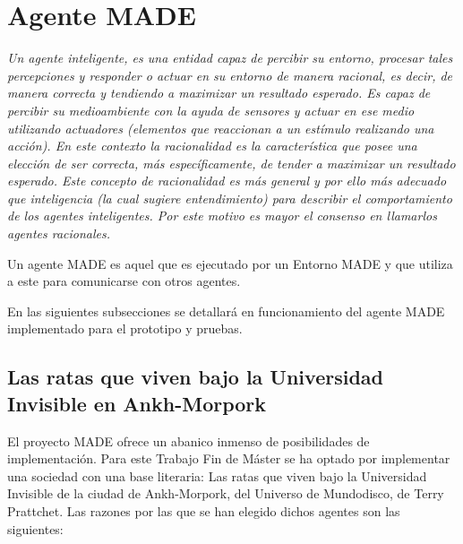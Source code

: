 

\section{Agente MADE}

\textit{Un agente inteligente, es una entidad capaz de percibir su entorno, procesar tales percepciones y responder o actuar en su entorno de manera racional, es decir, de manera correcta y tendiendo a maximizar un resultado esperado. Es capaz de percibir su medioambiente con la ayuda de sensores y actuar en ese medio utilizando actuadores (elementos que reaccionan a un estímulo realizando una acción).
En este contexto la racionalidad es la característica que posee una elección de ser correcta, más específicamente, de tender a maximizar un resultado esperado. Este concepto de racionalidad es más general y por ello más adecuado que inteligencia (la cual sugiere entendimiento) para describir el comportamiento de los agentes inteligentes. Por este motivo es mayor el consenso en llamarlos agentes racionales.}

Un agente MADE es aquel que es ejecutado por un Entorno MADE y que utiliza a este para comunicarse con otros agentes.

En las siguientes subsecciones se detallará en funcionamiento del agente MADE implementado para el prototipo y pruebas.


\subsection{Las ratas que viven bajo la Universidad Invisible en Ankh-Morpork }

El proyecto MADE ofrece un abanico inmenso de posibilidades de implementación. Para este Trabajo Fin de Máster se ha optado por implementar una sociedad con una base literaria: Las ratas que viven bajo la Universidad Invisible de la ciudad de Ankh-Morpork, del Universo de Mundodisco, de Terry Prattchet. Las razones por las que se han elegido dichos agentes son las siguientes:

